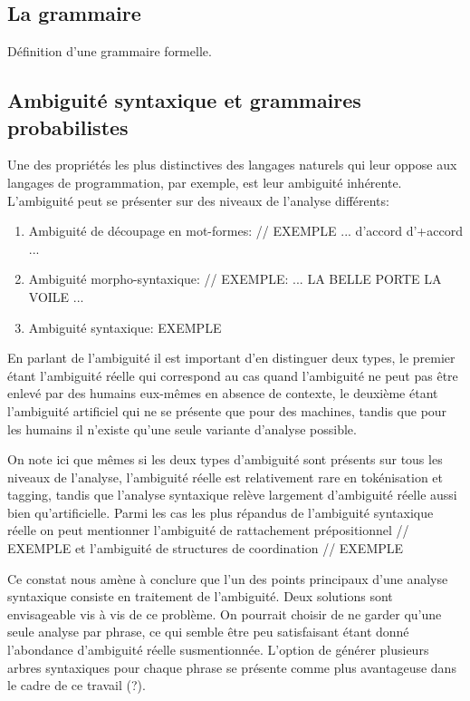 \documentclass[12pt]{article}
\begin{document}
\subsection{La grammaire}

D\'efinition d'une grammaire formelle.

\subsection{Ambiguit\'e syntaxique et grammaires probabilistes}

Une des propri\'et\'es les plus distinctives des langages naturels qui leur oppose aux langages de programmation, par exemple, est leur ambiguit\'e inh\'erente. L'ambiguit\'e peut se pr\'esenter sur des niveaux de l'analyse diff\'erents:
\begin{enumerate}
\item Ambiguit\'e de d\'ecoupage en mot-formes:
//
EXEMPLE ... d'accord d'+accord ...
\item Ambiguit\'e morpho-syntaxique:
//
EXEMPLE: ... LA BELLE PORTE LA VOILE ...
\item Ambiguit\'e syntaxique:
EXEMPLE
\end{enumerate}

En parlant de l'ambiguit\'e il est important d'en distinguer deux types, le premier \'etant l'ambiguit\'e r\'eelle qui correspond au cas quand l'ambiguit\'e ne peut pas \^etre enlev\'e par des humains eux-m\^emes en absence de contexte, le deuxi\`eme \'etant l'ambiguit\'e artificiel qui ne se pr\'esente que pour des machines, tandis que pour les humains il n'existe qu'une seule variante d'analyse possible.

On note ici que m\^emes si les deux types d'ambiguit\'e sont pr\'esents sur tous les niveaux de l'analyse, l'ambiguit\'e r\'eelle est relativement rare en tok\'enisation et tagging, tandis que l'analyse syntaxique
rel\`eve largement d'ambiguit\'e r\'eelle aussi bien qu'artificielle. Parmi les cas les plus r\'epandus de l'ambiguit\'e syntaxique r\'eelle on peut mentionner l'ambiguit\'e de rattachement pr\'epositionnel
// EXEMPLE
et l'ambiguit\'e de structures de coordination
// EXEMPLE

Ce constat nous am\`ene \`a conclure que l'un des points principaux d'une analyse syntaxique consiste en traitement de l'ambiguit\'e. Deux solutions sont envisageable vis \`a vis de ce probl\`eme. On pourrait choisir de ne garder qu'une seule analyse par phrase, ce qui semble \^etre peu satisfaisant \'etant donn\'e l'abondance d'ambiguit\'e r\'eelle susmentionn\'ee. L'option de g\'en\'erer plusieurs arbres syntaxiques pour chaque phrase se pr\'esente comme plus avantageuse dans le cadre de ce travail (?).
\end{document}
